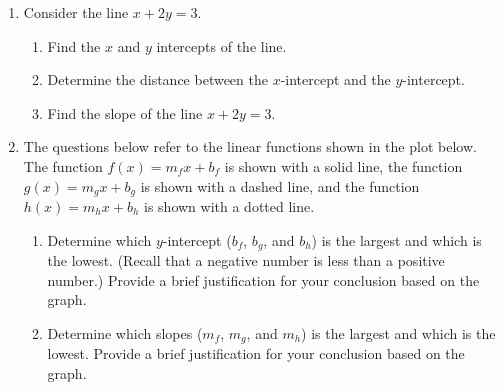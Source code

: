
\begin{enumerate}
\item Consider the line $x+2y=3$.
  \begin{enumerate}
  \item Find the $x$ and $y$ intercepts of the line.
  \item Determine the distance between the $x$-intercept and the $y$-intercept.
  \item Find the slope of the line $x+2y=3$.
  \end{enumerate}

\item The questions below refer to the linear functions shown in the
  plot below. The function $f(x)=m_f x + b_f$ is shown with a solid
  line, the function $g(x)=m_g x + b_g$ is shown with a dashed line,
  and the function $h(x) = m_h x + b_h$ is shown with a dotted line.


  \begin{enumerate}
    \item Determine which $y$-intercept ($b_f$, $b_g$, and $b_h$)
    is the largest and which is the lowest. (Recall that a negative
    number is less than a positive number.) Provide a brief
    justification for your conclusion based on the graph.

    \item Determine which slopes ($m_f$, $m_g$, and $m_h$) is the
    largest and which is the lowest.  Provide a brief justification
    for your conclusion based on the graph.


\end{enumerate}
\end{enumerate}
